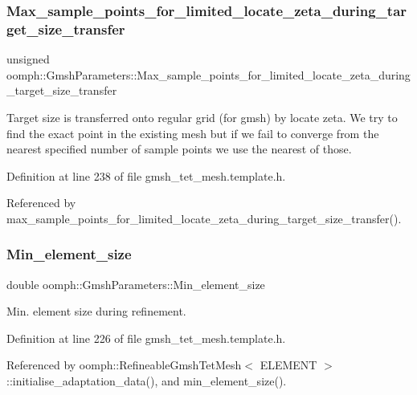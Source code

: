 \subsubsection{\texorpdfstring{Max\+\_\+sample\+\_\+points\+\_\+for\+\_\+limited\+\_\+locate\+\_\+zeta\+\_\+during\+\_\+target\+\_\+size\+\_\+transfer}{Max\_sample\_points\_for\_limited\_locate\_zeta\_during\_target\_size\_transfer}}
{\footnotesize\ttfamily unsigned oomph\+::\+Gmsh\+Parameters\+::\+Max\+\_\+sample\+\_\+points\+\_\+for\+\_\+limited\+\_\+locate\+\_\+zeta\+\_\+during\+\_\+target\+\_\+size\+\_\+transfer\hspace{0.3cm}{\ttfamily [private]}}



Target size is transferred onto regular grid (for gmsh) by locate zeta. We try to find the exact point in the existing mesh but if we fail to converge from the nearest specified number of sample points we use the nearest of those. 



Definition at line 238 of file gmsh\+\_\+tet\+\_\+mesh.\+template.\+h.



Referenced by max\+\_\+sample\+\_\+points\+\_\+for\+\_\+limited\+\_\+locate\+\_\+zeta\+\_\+during\+\_\+target\+\_\+size\+\_\+transfer().

\mbox{\label{classoomph_1_1GmshParameters_a8efec35bdf92a73cf71f25cff41520b7}} 
\subsubsection{\texorpdfstring{Min\+\_\+element\+\_\+size}{Min\_element\_size}}
{\footnotesize\ttfamily double oomph\+::\+Gmsh\+Parameters\+::\+Min\+\_\+element\+\_\+size\hspace{0.3cm}{\ttfamily [private]}}



Min. element size during refinement. 



Definition at line 226 of file gmsh\+\_\+tet\+\_\+mesh.\+template.\+h.



Referenced by oomph\+::\+Refineable\+Gmsh\+Tet\+Mesh$<$ E\+L\+E\+M\+E\+N\+T $>$\+::initialise\+\_\+adaptation\+\_\+data(), and min\+\_\+element\+\_\+size().

